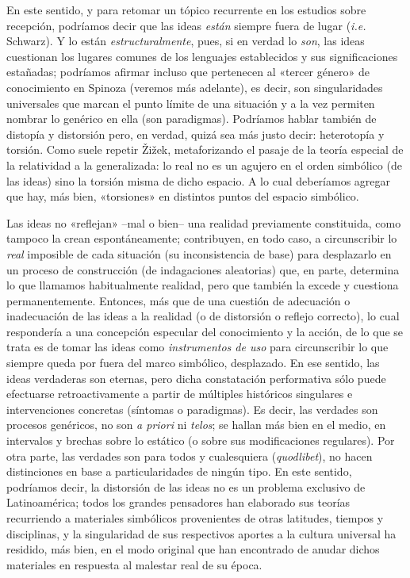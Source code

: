 En este sentido, y para retomar un tópico recurrente en los estudios sobre recepción, podríamos decir que las ideas \emph{están} siempre fuera de lugar (\emph{i.e.} Schwarz). Y lo están \emph{estructuralmente}, pues, si en verdad lo \emph{son}, las ideas cuestionan los lugares comunes de los lenguajes establecidos y sus significaciones estañadas; podríamos afirmar incluso que pertenecen al «tercer género» de conocimiento en Spinoza (veremos más adelante), es decir, son singularidades universales que marcan el punto límite de una situación y a la vez permiten nombrar lo genérico en ella (son paradigmas). Podríamos hablar también de distopía y distorsión pero, en verdad, quizá sea más justo decir: heterotopía y torsión. Como suele repetir Žižek, metaforizando el pasaje de la teoría especial de la relatividad a la generalizada: lo real no es un agujero en el orden simbólico (de las ideas) sino la torsión misma de dicho espacio. A lo cual deberíamos agregar que hay, más bien, «torsiones» en distintos puntos del espacio simbólico.

Las ideas no «reflejan» --mal o bien-- una realidad previamente constituida, como tampoco la crean espontáneamente; contribuyen, en todo caso, a circunscribir lo \emph{real} imposible de cada situación (su inconsistencia de base) para desplazarlo en un proceso de construcción (de indagaciones aleatorias) que, en parte, determina lo que llamamos habitualmente realidad, pero que también la excede y cuestiona permanentemente. Entonces, más que de una cuestión de adecuación o inadecuación de las ideas a la realidad (o de distorsión o reflejo correcto), lo cual respondería a una concepción especular del conocimiento y la acción, de lo que se trata es de tomar las ideas como \emph{instrumentos de uso} para circunscribir lo que siempre queda por fuera del marco simbólico, desplazado. En ese sentido, las ideas verdaderas son eternas, pero dicha constatación performativa sólo puede efectuarse retroactivamente a partir de múltiples históricos singulares e intervenciones concretas (síntomas o paradigmas). Es decir, las verdades son procesos genéricos, no son \emph{a priori} ni \emph{telos}; se hallan más bien en el medio, en intervalos y brechas sobre lo estático (o sobre sus modificaciones regulares). Por otra parte, las verdades son para todos y cualesquiera (\emph{quodlibet}), no hacen distinciones en base a particularidades de ningún tipo. En este sentido, podríamos decir, la distorsión de las ideas no es un problema exclusivo de Latinoamérica; todos los grandes pensadores han elaborado sus teorías recurriendo a materiales simbólicos provenientes de otras latitudes, tiempos y disciplinas, y la singularidad de sus respectivos aportes a la cultura universal ha residido, más bien, en el modo original que han encontrado de anudar dichos materiales en respuesta al malestar real de su época.

